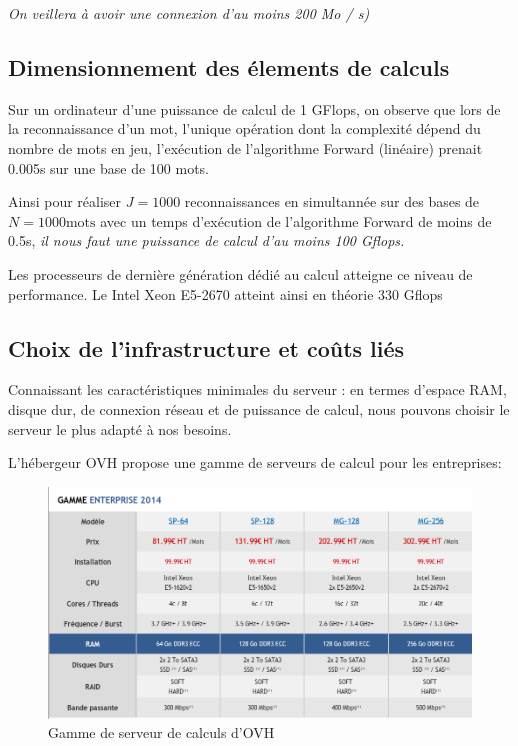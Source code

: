\documentclass[a4paper,12pt]{report}
\begin{document}
\emph{On veillera à avoir une connexion d'au moins 200 Mo / s)} 

\subsection{Dimensionnement des élements de calculs}

Sur un ordinateur d'une puissance de calcul de 1 GFlops, on observe que lors de la reconnaissance d'un mot, l'unique opération dont la complexité dépend du nombre de mots en jeu, l'exécution de l'algorithme Forward (linéaire) prenait 0.005s sur une base de 100 mots.

\medskip{}

Ainsi pour réaliser $J = 1000$ reconnaissances en simultannée sur des bases de $N = 1000 \text{mots}$ avec un temps d'exécution de l'algorithme Forward de moins de 0.5s, \emph{il nous faut une puissance de calcul d'au moins 100 Gflops.}

\medskip{}

Les processeurs de dernière génération dédié au calcul atteigne ce niveau de performance. Le Intel Xeon E5-2670 atteint ainsi en théorie 330 Gflops

\subsection{Choix de l'infrastructure et coûts liés}

Connaissant les caractéristiques minimales du serveur : en termes d'espace RAM, disque dur, de connexion réseau et de puissance de calcul, nous pouvons choisir le serveur le plus adapté à nos besoins.

\medskip{}

L'hébergeur OVH propose une gamme de serveurs de calcul pour les entreprises:

\begin{figure}[H]
	\begin{center}
	\includegraphics[width=14cm]{pics/server-gamme.png} 
	\end{center}
	\caption{Gamme de serveur de calculs d'OVH}
\end{figure}
\end{document}
